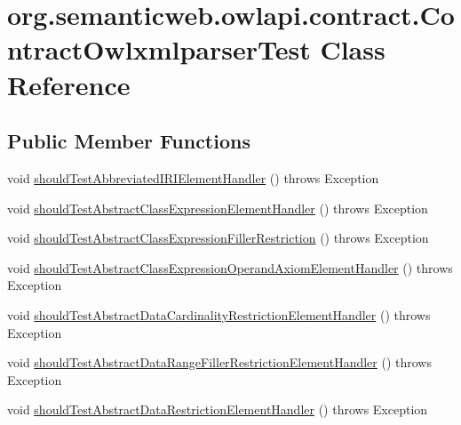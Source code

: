 \hypertarget{classorg_1_1semanticweb_1_1owlapi_1_1contract_1_1_contract_owlxmlparser_test}{\section{org.\-semanticweb.\-owlapi.\-contract.\-Contract\-Owlxmlparser\-Test Class Reference}
\label{classorg_1_1semanticweb_1_1owlapi_1_1contract_1_1_contract_owlxmlparser_test}
}
\subsection*{Public Member Functions}
\begin{DoxyCompactItemize}
\item 
void \hyperlink{classorg_1_1semanticweb_1_1owlapi_1_1contract_1_1_contract_owlxmlparser_test_a58d872447acd39cc75e5b3eb999f5ff7}{should\-Test\-Abbreviated\-I\-R\-I\-Element\-Handler} ()  throws Exception 
\item 
void \hyperlink{classorg_1_1semanticweb_1_1owlapi_1_1contract_1_1_contract_owlxmlparser_test_ac8c8a1b5426040a26d552804a331e75b}{should\-Test\-Abstract\-Class\-Expression\-Element\-Handler} ()  throws Exception 
\item 
void \hyperlink{classorg_1_1semanticweb_1_1owlapi_1_1contract_1_1_contract_owlxmlparser_test_a26d61d8162912bdbfb8cba4784d6c8db}{should\-Test\-Abstract\-Class\-Expression\-Filler\-Restriction} ()  throws Exception 
\item 
void \hyperlink{classorg_1_1semanticweb_1_1owlapi_1_1contract_1_1_contract_owlxmlparser_test_a995a8466c79cf7d6c4ed2805e3582396}{should\-Test\-Abstract\-Class\-Expression\-Operand\-Axiom\-Element\-Handler} ()  throws Exception 
\item 
void \hyperlink{classorg_1_1semanticweb_1_1owlapi_1_1contract_1_1_contract_owlxmlparser_test_ae370a7d3909c1bc6f55527e8f00543fe}{should\-Test\-Abstract\-Data\-Cardinality\-Restriction\-Element\-Handler} ()  throws Exception 
\item 
void \hyperlink{classorg_1_1semanticweb_1_1owlapi_1_1contract_1_1_contract_owlxmlparser_test_aedcdc33e51ebda839a115c84ff56ce7b}{should\-Test\-Abstract\-Data\-Range\-Filler\-Restriction\-Element\-Handler} ()  throws Exception 
\item 
void \hyperlink{classorg_1_1semanticweb_1_1owlapi_1_1contract_1_1_contract_owlxmlparser_test_a84e60afec943281267ad25103c742941}{should\-Test\-Abstract\-Data\-Restriction\-Element\-Handler} ()  throws Exception 

\end{DoxyCompactItemize}
